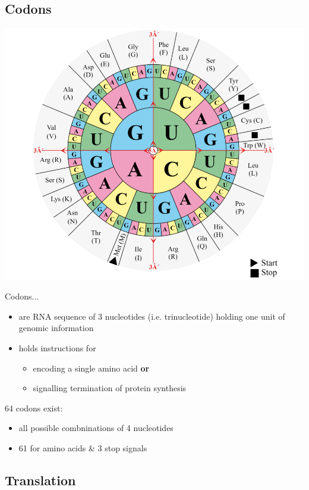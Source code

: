\documentclass[11pt,fleqn]{book} %
\begin{document}
\subsection{Codons}
\begin{center}
    \includegraphics[width=0.65\linewidth]{Pictures/Screenshot 2024-02-25 185241.png}
\end{center}
Codons...
\begin{itemize}
    \item are RNA sequence of 3 nucleotides (i.e. trinucleotide) holding one unit of genomic information
    \item holds instructions for
    \begin{itemize}
        \item encoding a single amino acid \textbf{or}
        \item signalling termination of protein synthesis
    \end{itemize}
\end{itemize}
64 codons exist:
\begin{itemize}
    \item all possible combninations of 4 nucleotides
    \item 61 for amino acids \& 3 stop signals
\end{itemize}
\subsection{Translation}
\end{document}

